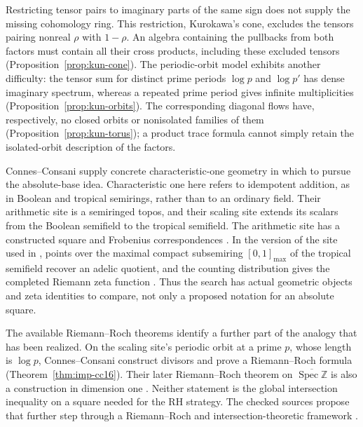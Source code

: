 \documentclass[11pt]{amsart}
\theoremstyle{plain}
\theoremstyle{definition}
\theoremstyle{remark}
\numberwithin{equation}{section}
\newcommand{\Z}{\mathbb{Z}}
\DeclareMathOperator{\Spec}{Spec}
\begin{document}
Restricting tensor pairs to imaginary parts of the same sign does not
supply the missing cohomology ring. This restriction, Kurokawa's cone,
excludes the tensors pairing nonreal $\rho$ with $1-\rho$. An algebra
containing the pullbacks from both factors must contain all their
cross products, including these excluded tensors
(Proposition~\ref{prop:kun-cone}). The periodic-orbit model exhibits
another difficulty: the tensor sum for distinct prime periods
$\log p$ and $\log p'$ has dense imaginary spectrum, whereas a repeated
prime period gives infinite multiplicities
(Proposition~\ref{prop:kun-orbits}). The corresponding diagonal flows
have, respectively, no closed orbits or nonisolated families of them
(Proposition~\ref{prop:kun-torus}); a product trace formula cannot simply
retain the isolated-orbit description of the factors.

Connes--Consani supply concrete characteristic-one geometry in which to
pursue the absolute-base idea. Characteristic one here refers to
idempotent addition, as in Boolean and tropical semirings, rather than
to an ordinary field. Their arithmetic site is a semiringed topos, and
their scaling site extends its scalars from the Boolean semifield to
the tropical semifield. The arithmetic site has a constructed square
and Frobenius correspondences
\cite[\S6]{ConnesConsani2016ArithmeticGeometry}. In the version of the
site used in \cite[Theorems~2.6--2.7]{ConnesConsani2014ArithmeticSite},
points over the maximal compact subsemiring $[0,1]_{\max}$ of the tropical
semifield
recover an adelic quotient, and the counting distribution gives the
completed Riemann zeta function
\cite[Theorems~2.6--2.7]{ConnesConsani2014ArithmeticSite}.
Thus the search has actual geometric objects and zeta identities to
compare, not only a proposed notation for an absolute square.

The available Riemann--Roch theorems identify a further part of the
analogy that has been realized. On the scaling site's periodic orbit
at a prime $p$, whose length is $\log p$, Connes--Consani construct
divisors and prove a Riemann--Roch formula
(Theorem~\ref{thm:imp-cc16}). Their later Riemann--Roch theorem on
$\overline{\Spec\Z}$ is also a construction in dimension one
\cite[Theorem~1.1, p.~2]{ConnesConsani2023RiemannRochSpecZ}.
Neither statement is the global intersection inequality on a square
needed for the RH strategy. The checked sources propose that further
step through a Riemann--Roch and intersection-theoretic framework
\cite[\S3, pp.~16--18, and p.~22]{ConnesConsani2018RiemannRoch}.
\end{document}
